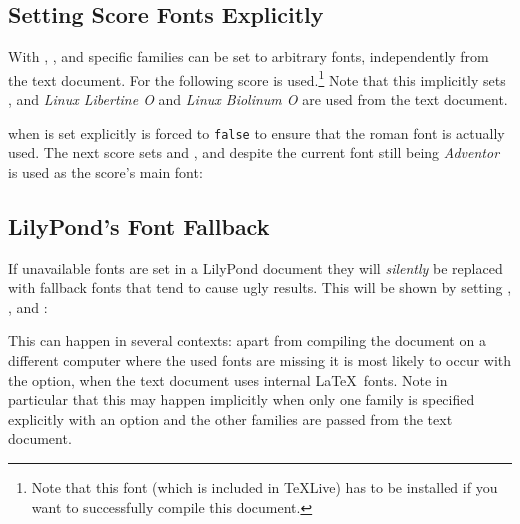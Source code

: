 \documentclass{lyluatexexample}
\begin{document}
\bigskip
{}

\subsection*{Setting Score Fonts Explicitly}

With , , and  specific
families can be set to arbitrary fonts, independently from the text document.
For the following score  is
used.\footnote{Note that this font (which is included in TeXLive) has to be
installed if you want to successfully compile this document.} Note that this
implicitly sets , and \emph{Linux Libertine O} and
\emph{Linux Biolinum O} are used from the text document.

\bigskip
{}

 when  is set explicitly
 is forced to \texttt{false} to ensure that the
roman font is actually used. The next score sets  and , and despite the current font still being 
\emph{Adventor} is used as the score's main font:

\bigskip
{}

\subsection*{LilyPond's Font Fallback}

If unavailable fonts are set in a LilyPond document they will \emph{silently} be
replaced with fallback fonts that tend to cause ugly results. This will be shown
by setting , ,
and :

\bigskip
{}

This can happen in several contexts: apart from compiling the document on a
different computer where the used fonts are missing it is most likely to occur
with the  option, when the text document uses internal
\LaTeX\ fonts. Note in particular that this may happen implicitly when only one
family is specified explicitly with an option and the other families are passed
from the text document.
\end{document}
